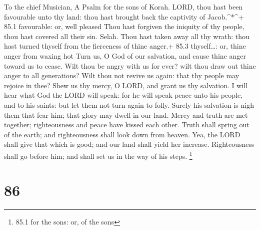 To the chief Musician, A Psalm for the sons of Korah.  LORD,
thou hast been favourable unto thy land: thou hast brought back the
captivity of Jacob.\^{}*\^{}+ 85.1 favourable: or, well pleased
 Thou hast forgiven the iniquity of thy people, thou hast
covered all their sin. Selah.  Thou hast taken away all thy
wrath: thou hast turned thyself from the fierceness of thine anger.+
85.3 thyself\ldots: or, thine anger from waxing hot  Turn
us, O God of our salvation, and cause thine anger toward us to cease.
 Wilt thou be angry with us for ever? wilt thou draw out
thine anger to all generations?  Wilt thou not revive us
again: that thy people may rejoice in thee?  Shew us thy
mercy, O LORD, and grant us thy salvation.  I will hear what
God the LORD will speak: for he will speak peace unto his people, and to
his saints: but let them not turn again to folly.  Surely
his salvation is nigh them that fear him; that glory may dwell in our
land.  Mercy and truth are met together; righteousness and
peace have kissed each other.  Truth shall spring out of
the earth; and righteousness shall look down from heaven. 
Yea, the LORD shall give that which is good; and our land shall yield
her increase.  Righteousness shall go before him; and shall
set us in the way of his steps. \footnote{85.1 for the sons: or, of the
  sons}

\hypertarget{section-85}{%
\section{86}\label{section-85}}

